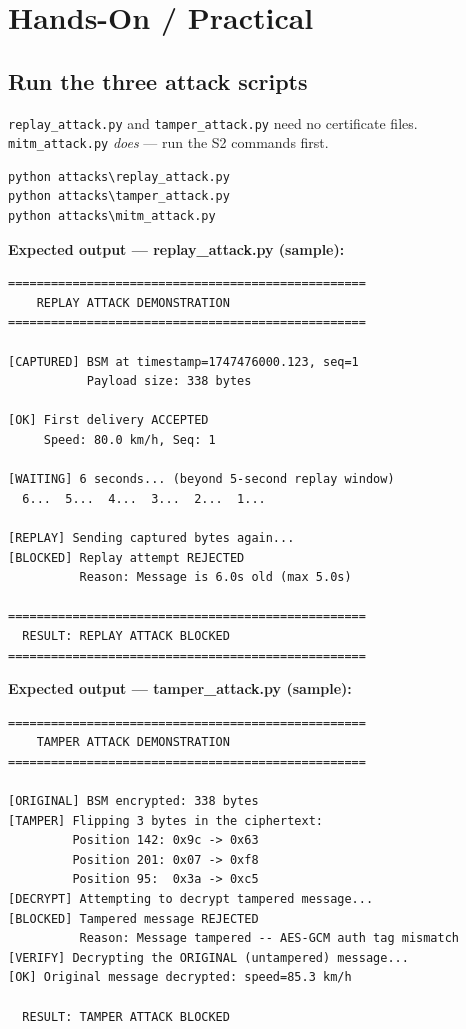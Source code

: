 \documentclass[11pt,a4paper]{article}
\begin{document}
\section{Hands-On / Practical}

\subsection{Run the three attack scripts}
\texttt{replay\_attack.py} and \texttt{tamper\_attack.py} need no certificate
files. \texttt{mitm\_attack.py} \emph{does} --- run the S2 commands first.
\begin{lstlisting}[style=term]
python attacks\replay_attack.py
python attacks\tamper_attack.py
python attacks\mitm_attack.py
\end{lstlisting}

\noindent\textbf{Expected output --- replay\_attack.py (sample):}
\begin{lstlisting}[style=term]
==================================================
    REPLAY ATTACK DEMONSTRATION
==================================================

[CAPTURED] BSM at timestamp=1747476000.123, seq=1
           Payload size: 338 bytes

[OK] First delivery ACCEPTED
     Speed: 80.0 km/h, Seq: 1

[WAITING] 6 seconds... (beyond 5-second replay window)
  6...  5...  4...  3...  2...  1...

[REPLAY] Sending captured bytes again...
[BLOCKED] Replay attempt REJECTED
          Reason: Message is 6.0s old (max 5.0s)

==================================================
  RESULT: REPLAY ATTACK BLOCKED
==================================================
\end{lstlisting}

\noindent\textbf{Expected output --- tamper\_attack.py (sample):}
\begin{lstlisting}[style=term]
==================================================
    TAMPER ATTACK DEMONSTRATION
==================================================

[ORIGINAL] BSM encrypted: 338 bytes
[TAMPER] Flipping 3 bytes in the ciphertext:
         Position 142: 0x9c -> 0x63
         Position 201: 0x07 -> 0xf8
         Position 95:  0x3a -> 0xc5
[DECRYPT] Attempting to decrypt tampered message...
[BLOCKED] Tampered message REJECTED
          Reason: Message tampered -- AES-GCM auth tag mismatch
[VERIFY] Decrypting the ORIGINAL (untampered) message...
[OK] Original message decrypted: speed=85.3 km/h

  RESULT: TAMPER ATTACK BLOCKED
\end{lstlisting}
\end{document}
